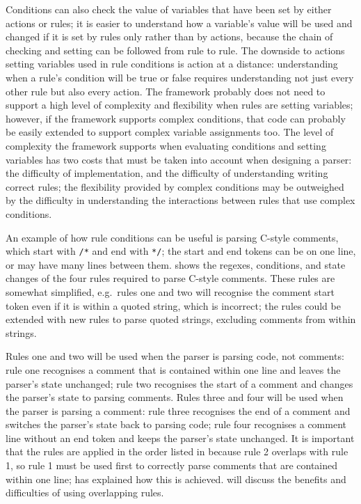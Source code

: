 Conditions can also check the value of variables that have been set by
either actions or rules; it is easier to understand how a variable's value
will be used and changed if it is set by rules only rather than by actions,
because the chain of checking and setting can be followed from rule to
rule.  The downside to actions setting variables used in rule conditions is
action at a distance: understanding when a rule's condition will be true or
false requires understanding not just every other rule but also every
action.  The framework probably does not need to support a high level of
complexity and flexibility when rules are setting variables; however, if
the framework supports complex conditions, that code can probably be easily
extended to support complex variable assignments too.  The level of
complexity the framework supports when evaluating conditions and setting
variables has two costs that must be taken into account when designing a
parser: the difficulty of implementation, and the difficulty of
understanding writing correct rules; the flexibility provided by complex
conditions may be outweighed by the difficulty in understanding the
interactions between rules that use complex conditions.

An example of how rule conditions can be useful is parsing C-style
comments, which start with \texttt{/*} and end with \texttt{*/}; the start
and end tokens can be on one line, or may have many lines between them.
 shows the regexes, conditions,
and state changes of the four rules required to parse C-style comments.
These rules are somewhat simplified, e.g.\ rules one and two will recognise
the comment start token even if it is within a quoted string, which is
incorrect; the rules could be extended with new rules to parse quoted
strings, excluding comments from within strings.

Rules one and two will be used when the parser is parsing code, not
comments: rule one recognises a comment that is contained within one line
and leaves the parser's state unchanged; rule two recognises the start of a
comment and changes the parser's state to parsing comments.  Rules three
and four will be used when the parser is parsing a comment: rule three
recognises the end of a comment and switches the parser's state back to
parsing code; rule four recognises a comment line without an end token and
keeps the parser's state unchanged.  It is important that the rules are
applied in the order listed in 
because rule 2 overlaps with rule 1, so rule 1 must be used first to
correctly parse comments that are contained within one line;
 has explained how this is achieved.
 will discuss the benefits
and difficulties of using overlapping rules.

